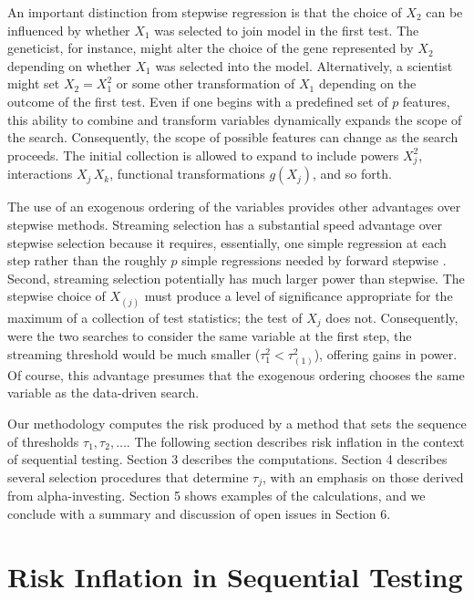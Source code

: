 \documentclass[12pt]{article}
\begin{document}
 An important distinction from stepwise regression is that the choice of $X_2$
 can be influenced by whether $X_1$ was selected to join model in the first
 test.  The geneticist, for instance, might alter the choice of the gene
 represented by $X_2$ depending on whether $X_1$ was selected into the model.
  Alternatively, a scientist might set $X_2 = X_1^2$ or some other
 transformation of $X_1$ depending on the outcome of the first test.  Even if
 one begins with a predefined set of $p$ features, this ability to combine and
 transform variables dynamically expands the scope of the search.  Consequently,
 the scope of possible features can change as the search proceeds.  The initial
 collection is allowed to expand to include powers $X_j^2$, interactions
 $X_j\,X_k$, functional transformations $g(X_j)$, and so forth.


 The use of an exogenous ordering of the variables provides other advantages
 over stepwise methods.  Streaming selection has a substantial speed advantage
 over stepwise selection because it requires, essentially, one simple regression
 at each step rather than the roughly $p$ simple regressions needed by forward
 stepwise \citep{fosterlin10, langford}.  Second, streaming selection
 potentially has much larger power than stepwise.  The stepwise choice of
 $X_{(j)}$ must produce a level of significance appropriate for the maximum of a
 collection of test statistics; the test of $X_j$ does not.  Consequently, were
 the two searches to consider the same variable at the first step, the streaming
 threshold would be much smaller ($\tau_1^2 < \tau_{(1)}^2$), offering gains in
 power.  Of course, this advantage presumes that the exogenous ordering chooses
 the same variable as the data-driven search.



 Our methodology computes the risk produced by a method that sets the sequence
 of thresholds $\tau_1, \tau_2, \ldots$.  The following section describes risk
 inflation in the context of sequential testing.  Section 3 describes the
 computations.  Section 4 describes several selection procedures that determine
 $\tau_j$, with an emphasis on those derived from alpha-investing.  Section 5
 shows examples of the calculations, and we conclude with a summary and
 discussion of open issues in Section 6.


\section{ Risk Inflation in Sequential Testing }
\end{document}
